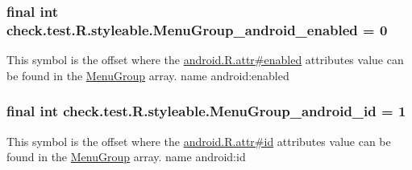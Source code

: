 \subsubsection[{Menu\+Group\+\_\+android\+\_\+enabled}]{\setlength{\rightskip}{0pt plus 5cm}final int check.\+test.\+R.\+styleable.\+Menu\+Group\+\_\+android\+\_\+enabled = 0\hspace{0.3cm}{\ttfamily [static]}}\label{classcheck_1_1test_1_1_r_1_1styleable_a4181140c18864b52c09f5f001c0f9cba}
This symbol is the offset where the \hyperlink{}{android.\+R.\+attr\#enabled} attribute\textquotesingle{}s value can be found in the \hyperlink{classcheck_1_1test_1_1_r_1_1styleable_a95a67e0fb4cd8754aea3728538c936cf}{Menu\+Group} array.  name android\+:enabled \hypertarget{classcheck_1_1test_1_1_r_1_1styleable_a46daffdbc2d6252d224472748228ac3c}{}
\subsubsection[{Menu\+Group\+\_\+android\+\_\+id}]{\setlength{\rightskip}{0pt plus 5cm}final int check.\+test.\+R.\+styleable.\+Menu\+Group\+\_\+android\+\_\+id = 1\hspace{0.3cm}{\ttfamily [static]}}\label{classcheck_1_1test_1_1_r_1_1styleable_a46daffdbc2d6252d224472748228ac3c}
This symbol is the offset where the \hyperlink{}{android.\+R.\+attr\#id} attribute\textquotesingle{}s value can be found in the \hyperlink{classcheck_1_1test_1_1_r_1_1styleable_a95a67e0fb4cd8754aea3728538c936cf}{Menu\+Group} array.  name android\+:id \hypertarget{classcheck_1_1test_1_1_r_1_1styleable_ab4abe6642c85e78a9af64e1d520a3856}{}
